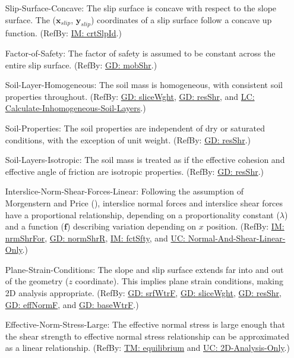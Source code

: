 \documentclass[12pt]{article}
\begin{document}
\begin{itemize}
\item[Slip-Surface-Concave:\phantomsection\label{assumpSSC}]The slip surface is concave with respect to the slope surface. The (${\mathbf{x}_{slip}}$, ${\mathbf{y}_{slip}}$) coordinates of a slip surface follow a concave up function. (RefBy: \hyperref[IM:crtSlpId]{IM: crtSlpId}.)
\item[Factor-of-Safety:\phantomsection\label{assumpFOS}]The factor of safety is assumed to be constant across the entire slip surface. (RefBy: \hyperref[GD:mobShr]{GD: mobShr}.)
\item[Soil-Layer-Homogeneous:\phantomsection\label{assumpSLH}]The soil mass is homogeneous, with consistent soil properties throughout. (RefBy: \hyperref[GD:sliceWght]{GD: sliceWght}, \hyperref[GD:resShr]{GD: resShr}, and \hyperref[LC_inhomogeneous]{LC: Calculate-Inhomogeneous-Soil-Layers}.)
\item[Soil-Properties:\phantomsection\label{assumpSP}]The soil properties are independent of dry or saturated conditions, with the exception of unit weight. (RefBy: \hyperref[GD:resShr]{GD: resShr}.)
\item[Soil-Layers-Isotropic:\phantomsection\label{assumpSLI}]The soil mass is treated as if the effective cohesion and effective angle of friction are isotropic properties. (RefBy: \hyperref[GD:resShr]{GD: resShr}.)
\item[Interslice-Norm-Shear-Forces-Linear:\phantomsection\label{assumpINSFL}]Following the assumption of Morgenstern and Price (\cite{morgenstern1965}), interslice normal forces and interslice shear forces have a proportional relationship, depending on a proportionality constant ($λ$) and a function ($\mathbf{f}$) describing variation depending on $x$ position. (RefBy: \hyperref[IM:nrmShrFor]{IM: nrmShrFor}, \hyperref[GD:normShrR]{GD: normShrR}, \hyperref[IM:fctSfty]{IM: fctSfty}, and \hyperref[UC_normshearlinear]{UC: Normal-And-Shear-Linear-Only}.)
\item[Plane-Strain-Conditions:\phantomsection\label{assumpPSC}]The slope and slip surface extends far into and out of the geometry ($z$ coordinate). This implies plane strain conditions, making 2D analysis appropriate. (RefBy: \hyperref[GD:srfWtrF]{GD: srfWtrF}, \hyperref[GD:sliceWght]{GD: sliceWght}, \hyperref[GD:resShr]{GD: resShr}, \hyperref[GD:effNormF]{GD: effNormF}, and \hyperref[GD:baseWtrF]{GD: baseWtrF}.)
\item[Effective-Norm-Stress-Large:\phantomsection\label{assumpENSL}]The effective normal stress is large enough that the shear strength to effective normal stress relationship can be approximated as a linear relationship. (RefBy: \hyperref[TM:equilibrium]{TM: equilibrium} and \hyperref[UC_2donly]{UC: 2D-Analysis-Only}.)

\end{itemize}
\end{document}
